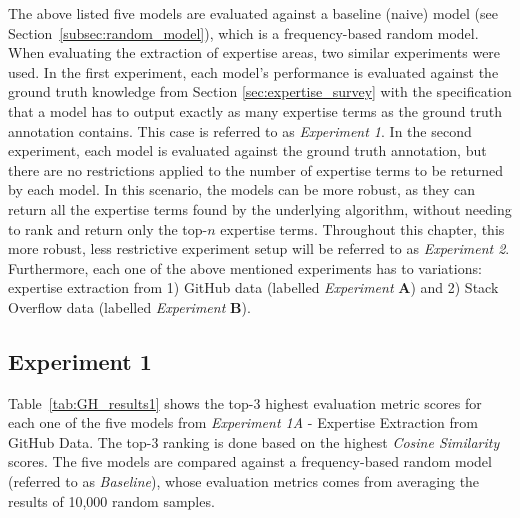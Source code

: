         The above listed five models are evaluated against a baseline (naive) model (see Section~\ref{subsec:random_model}), which is a frequency-based random model. When evaluating the extraction of expertise areas, two similar experiments were used. In the first experiment, each model's performance is evaluated against the ground truth knowledge from Section \ref{sec:expertise_survey} with the specification that a model has to output exactly as many expertise terms as the ground truth annotation contains. This case is referred to as \emph{Experiment 1}. In the second experiment, each model is evaluated against the ground truth annotation, but there are no restrictions applied to the number of expertise terms to be returned by each model. In this scenario, the models can be more robust, as they can return all the expertise terms found by the underlying algorithm, without needing to rank and return only the top-$n$ expertise terms. Throughout this chapter, this more robust, less restrictive experiment setup will be referred to as \emph{Experiment 2}. Furthermore, each one of the above mentioned experiments has to variations: expertise extraction from 1) GitHub data (labelled \emph{Experiment} \textbf{A}) and 2) Stack Overflow data (labelled \emph{Experiment} \textbf{B}).
        
        \subsection{Experiment 1}
        
            Table~\ref{tab:GH_results1} shows the top-$3$ highest evaluation metric scores for each one of the five models from \emph{Experiment 1A} - Expertise Extraction from GitHub Data. The top-$3$ ranking is done based on the highest \emph{Cosine Similarity} scores. The five models are compared against a frequency-based random model (referred to as \emph{Baseline}), whose evaluation metrics comes from averaging the results of 10,000 random samples.
            
